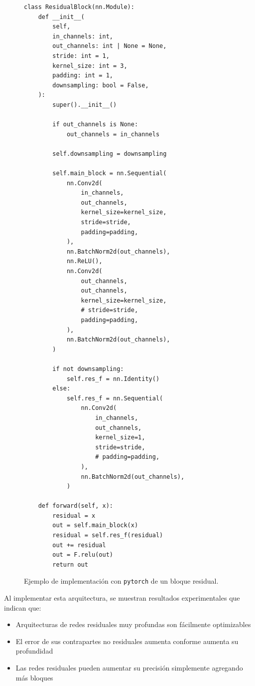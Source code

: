 \documentclass[titlepage,a4paper,oneside]{article}
\begin{document}
\begin{figure}[H]
\begin{verbatim}
class ResidualBlock(nn.Module):
    def __init__(
        self,
        in_channels: int,
        out_channels: int | None = None,
        stride: int = 1,
        kernel_size: int = 3,
        padding: int = 1,
        downsampling: bool = False,
    ):
        super().__init__()

        if out_channels is None:
            out_channels = in_channels

        self.downsampling = downsampling

        self.main_block = nn.Sequential(
            nn.Conv2d(
                in_channels,
                out_channels,
                kernel_size=kernel_size,
                stride=stride,
                padding=padding,
            ),
            nn.BatchNorm2d(out_channels),
            nn.ReLU(),
            nn.Conv2d(
                out_channels,
                out_channels,
                kernel_size=kernel_size,
                # stride=stride,
                padding=padding,
            ),
            nn.BatchNorm2d(out_channels),
        )

        if not downsampling:
            self.res_f = nn.Identity()
        else:
            self.res_f = nn.Sequential(
                nn.Conv2d(
                    in_channels,
                    out_channels,
                    kernel_size=1,
                    stride=stride,
                    # padding=padding,
                ),
                nn.BatchNorm2d(out_channels),
            )

    def forward(self, x):
        residual = x
        out = self.main_block(x)
        residual = self.res_f(residual)
        out += residual
        out = F.relu(out)
        return out
\end{verbatim}
\label{resnet_torch}
\caption{Ejemplo de implementación con \texttt{pytorch} de un bloque residual.}
\end{figure}

Al implementar esta arquitectura, se muestran resultados experimentales que indican que:
\begin{itemize}
	\item Arquitecturas de redes residuales muy profundas son fácilmente optimizables
	\item El error de sus contrapartes no residuales aumenta conforme aumenta su profundidad
	\item Las redes residuales pueden aumentar su precisión simplemente agregando más bloques
\end{itemize}
\end{document}
